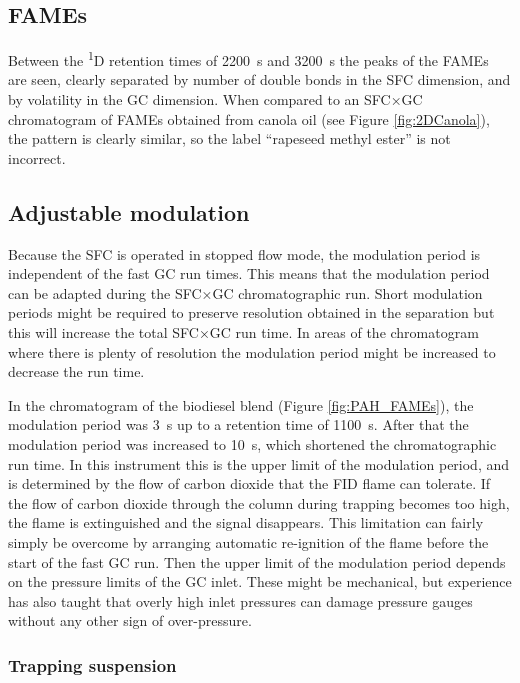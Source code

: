\subsection{FAMEs}

Between the \textsuperscript{1}D retention times of \SI{2200}{\second} and
\SI{3200}{\second} the peaks of the FAMEs are seen, clearly separated by number
of double bonds in the SFC dimension, and by volatility in the GC dimension.
When compared to an SFC×GC chromatogram of FAMEs obtained from canola oil (see
Figure \ref{fig:2DCanola}), the pattern is clearly similar, so the label
``rapeseed methyl ester'' is not incorrect.

\subsection{Adjustable modulation}

Because the SFC is operated in stopped flow mode, the modulation period is
independent of the fast GC run times. This means that the modulation period can
be adapted during the SFC×GC chromatographic run. Short modulation periods might
be required to preserve resolution obtained in the \oneD separation but this
will increase the total SFC×GC run time. In areas of the chromatogram where
there is plenty of resolution the modulation period might be increased to
decrease the run time.

In the chromatogram of the biodiesel blend (Figure \ref{fig:PAH_FAMEs}), the
modulation period was \SI{3}{\second} up to a \oneD retention time of
\SI{1100}{s}. After that the modulation period was increased to
\SI{10}{\second}, which shortened the chromatographic run time. In this
instrument this is the upper limit of the modulation period, and is determined
by the flow of carbon dioxide that the FID flame can tolerate. If the flow of
carbon dioxide through the column during trapping becomes too high, the flame is
extinguished and the signal disappears. This limitation can fairly simply be
overcome by arranging automatic re-ignition of the flame before the start of the
fast GC run. Then the upper limit of the modulation period depends on the
pressure limits of the GC inlet. These might be mechanical, but experience has
also taught that overly high inlet pressures can damage pressure gauges without
any other sign of over-pressure.

\subsubsection{Trapping suspension}

